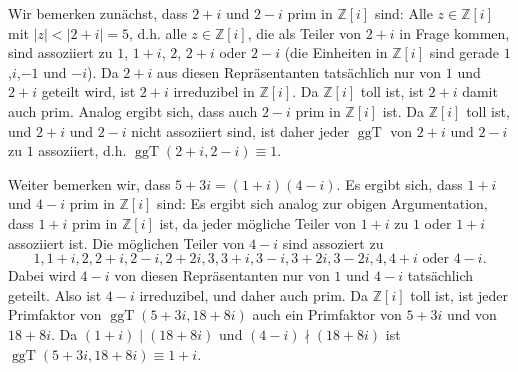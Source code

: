 \documentclass[a4paper,10pt]{article}
\newcommand{\Z}{\mathbb{Z}}
\newcommand{\ggT}{\operatorname{ggT}}
\begin{document}
Wir bemerken zunächst, dass $2+i$ und $2-i$ prim in $\Z[i]$ sind: Alle $z \in \Z[i]$ mit $|z| < |2+i| = 5$, d.h. alle $z \in \Z[i]$, die als Teiler von $2+i$ in Frage kommen, sind assoziiert zu $1$, $1+i$, $2$, $2+i$ oder $2-i$ (die Einheiten in $\Z[i]$ sind gerade $1$,$i$,$-1$ und $-i$). Da $2+i$ aus diesen Repräsentanten tatsächlich nur von $1$ und $2+i$ geteilt wird, ist $2+i$ irreduzibel in $\Z[i]$. Da $\Z[i]$ toll ist, ist $2+i$ damit auch prim. Analog ergibt sich, dass auch $2-i$ prim in $\Z[i]$ ist. Da $\Z[i]$ toll ist, und $2+i$ und $2-i$ nicht assoziiert sind, ist daher jeder $\ggT$ von $2+i$ und $2-i$ zu $1$ assoziiert, d.h. $\ggT(2+i,2-i) \equiv 1$.

Weiter bemerken wir, dass $5+3i = (1+i)(4-i)$. Es ergibt sich, dass $1+i$ und $4-i$ prim in $\Z[i]$ sind: Es ergibt sich analog zur obigen Argumentation, dass $1+i$ prim in $\Z[i]$ ist, da jeder mögliche Teiler von $1+i$ zu $1$ oder $1+i$ assoziiert ist. Die möglichen Teiler von $4-i$ sind assoziert zu
\[
 1, 1+i, 2, 2+i, 2-i, 2+2i, 3, 3+i, 3-i, 3+2i, 3-2i, 4, 4+i \text{ oder } 4-i.
\]
Dabei wird $4-i$ von diesen Repräsentanten nur von $1$ und $4-i$ tatsächlich geteilt. Also ist $4-i$ irreduzibel, und daher auch prim. Da $\Z[i]$ toll ist, ist jeder Primfaktor von $\ggT(5+3i,18+8i)$ auch ein Primfaktor von $5+3i$ und von $18+8i$. Da $(1+i) \mid (18+8i)$ und $(4-i) \nmid (18+8i)$ ist $\ggT(5+3i,18+8i) \equiv 1+i$.
\end{document}

